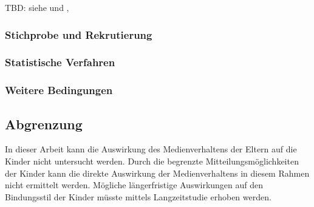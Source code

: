 TBD: siehe \cite{AmericanAcademyofPediatrics2013} und \cite{Plowman2014}, \cite{Nikken2014}

\subsubsection{Stichprobe und Rekrutierung}
\subsubsection{Statistische Verfahren}
\subsubsection{Weitere Bedingungen}
\subsection{Abgrenzung}
In dieser Arbeit kann die Auswirkung des Medienverhaltens der Eltern auf die Kinder nicht untersucht werden. Durch die begrenzte Mitteilungsmöglichkeiten der Kinder kann die direkte Auswirkung der Medienverhaltens in diesem Rahmen nicht ermittelt werden. Mögliche längerfristige Auswirkungen auf den Bindungsstil der Kinder müsste mittels Langzeitstudie erhoben werden. 
